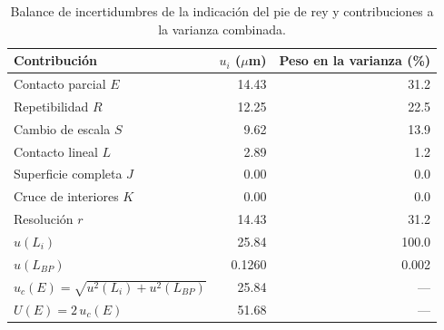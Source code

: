 \begin{table}[H]
\centering
\caption{Balance de incertidumbres de la indicación del pie de rey y contribuciones a la varianza combinada.}
\label{tab:pie-rey-balance}
\begin{tabular}{lrr}
\toprule
Contribución & $u_i$ ($\mu$m) & Peso en la varianza (\%) \\
\midrule
Contacto parcial $E$ & 14.43 & 31.2 \\
Repetibilidad $R$ & 12.25 & 22.5 \\
Cambio de escala $S$ & 9.62 & 13.9 \\
Contacto lineal $L$ & 2.89 & 1.2 \\
Superficie completa $J$ & 0.00 & 0.0 \\
Cruce de interiores $K$ & 0.00 & 0.0 \\
Resolución $r$ & 14.43 & 31.2 \\
$u(L_i)$ & 25.84 & 100.0 \\
$u(L_{BP})$ & 0.1260 & 0.002 \\
$u_c(E) = \sqrt{u^2(L_i) + u^2(L_{BP})}$ & 25.84 & — \\
$U(E) = 2\,u_c(E)$ & 51.68 & — \\
\bottomrule
\end{tabular}
\end{table}
